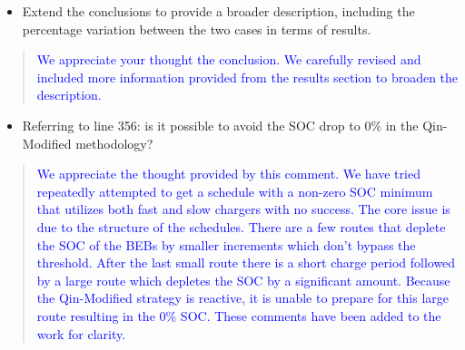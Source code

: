 \documentclass[11pt,a4paper,final]{article}
\begin{document}
\begin{itemize}
\item Extend the conclusions to provide a broader description, including the percentage variation between the two cases in terms of results.
\end{itemize}

\begin{quote}
  \textcolor{blue}{We appreciate your thought the conclusion. We carefully revised and included more information provided from the results section to broaden the description.}
\end{quote}

\begin{itemize}
\item Referring to line 356: is it possible to avoid the SOC drop to 0\% in the Qin-Modified methodology?
\end{itemize}

\begin{quote}
  \textcolor{blue}{We appreciate the thought provided by this comment. We have tried repeatedly attempted to get a schedule with a non-zero SOC minimum that utilizes both fast and slow chargers with no success. The core issue is due to the structure of the schedules. There are a few routes that deplete the SOC of the BEBs by smaller increments which don't bypass the threshold. After the last small route there is a short charge period followed by a large route which depletes the SOC by a significant amount. Because the Qin-Modified strategy is reactive, it is unable to prepare for this large route resulting in the 0\% SOC. These comments have been added to the work for clarity.}
\end{quote}
\end{document}
